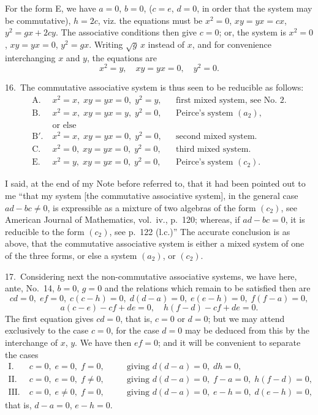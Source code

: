 \documentclass[11pt,a4paper]{article}
\theoremstyle{plain}
\theoremstyle{definition}
\theoremstyle{remark}
\begin{document}
For the form E, we have $a=0$, $b=0$, ($c=e$, $d=0$, in order that the system may be commutative), $h=2c$, viz. the equations must be $x^2=0$, $xy=yx=cx$, $y^2=gx+2cy$. The associative conditions then give $c=0$; or, the system is $x^2=0$, $xy=yx=0$, $y^2=gx$. Writing $\sqrt{g}\,x$ instead of $x$, and for convenience interchanging $x$ and $y$, the equations are
\[
x^2=y,\quad xy=yx=0,\quad y^2=0.
\]

16.~The commutative associative system is thus seen to be reducible as follows:
\begin{align*}
\text{A.}\;& x^2=x,\; xy=yx=0,\; y^2=y, && \text{first mixed system, see No.~2.}\\
\text{B.}\;& x^2=x,\; xy=yx=y,\; y^2=0, && \text{Peirce's system $(a_2)$,}\\
&\text{or else}\\
\text{B$'$.}\;& x^2=x,\; xy=yx=0,\; y^2=0, && \text{second mixed system.}\\
\text{C.}\;& x^2=0,\; xy=yx=0,\; y^2=0, && \text{third mixed system.}\\
\text{E.}\;& x^2=y,\; xy=yx=0,\; y^2=0, && \text{Peirce's system $(c_2)$.}
\end{align*}

I said, at the end of my Note before referred to, that it had been pointed out to me ``that my system [the commutative associative system], in the general case $ad-bc\neq 0$, is expressible as a mixture of two algebras of the form $(c_2)$, see American Journal of Mathematics, vol.~iv., p.~120; whereas, if $ad-bc=0$, it is reducible to the form $(c_2)$, see p.~122 (l.c.)'' The accurate conclusion is as above, that the commutative associative system is either a mixed system of one of the three forms, or else a system $(a_2)$, or $(c_2)$.

17.~Considering next the non-commutative associative systems, we have here, ante, No.~14, $b=0$, $g=0$ and the relations which remain to be satisfied then are
\[
cd=0,\; ef=0,\; c(c-h)=0,\; d(d-a)=0,\; e(e-h)=0,\; f(f-a)=0,
\]
\[
a(c-e)-cf+de=0,\quad h(f-d)-cf+de=0.
\]
The first equation gives $cd=0$, that is, $c=0$ or $d=0$; but we may attend exclusively to the case $c=0$, for the case $d=0$ may be deduced from this by the interchange of $x$, $y$. We have then $ef=0$; and it will be convenient to separate the cases
\begin{align*}
\text{I.}\;& c=0,\; e=0,\; f=0,\quad &&\text{giving } d(d-a)=0,\; dh=0,\\
\text{II.}\;& c=0,\; e=0,\; f\neq 0,\quad &&\text{giving } d(d-a)=0,\; f-a=0,\; h(f-d)=0,\\
\text{III.}\;& c=0,\; e\neq 0,\; f=0,\quad &&\text{giving } d(d-a)=0,\; e-h=0,\; d(e-h)=0,
\end{align*}
that is, $d-a=0$, $e-h=0$.
\end{document}
